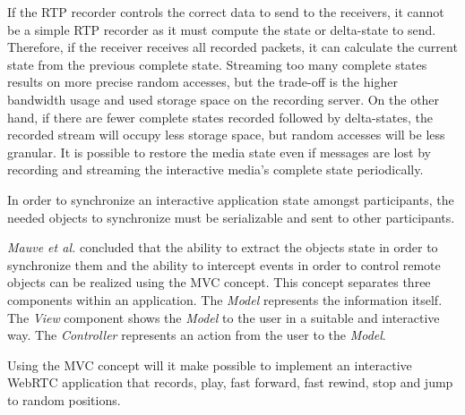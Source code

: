 	If the \ac{RTP} recorder controls the correct data to send to the receivers, it cannot be a simple \ac{RTP} recorder as it must compute the state or delta-state to send. Therefore, if the receiver receives all recorded packets, it can calculate the current state from the previous complete state. Streaming too many complete states results on more precise random accesses, but the trade-off is the higher bandwidth usage and used storage space on the recording server. On the other hand, if there are fewer complete states recorded followed by delta-states, the recorded stream will occupy less storage space, but random accesses will be less granular.
	It is possible to restore the media state even if messages are lost by recording and streaming the interactive media's complete state periodically.

	In order to synchronize an interactive application state amongst participants, the needed objects to synchronize must be serializable and sent to other participants.

	\emph{Mauve et al.} concluded that the ability to extract the objects state in order to synchronize them and the ability to intercept events in order to control remote objects can be realized using the \ac{MVC} concept\cite{interactive_stream}.
        This concept separates three components within an application. The \emph{Model} represents the information itself. The \emph{View} component shows the \emph{Model} to the user in a suitable and interactive way. The \emph{Controller} represents an action from the user to the \emph {Model}. 

	Using the \ac{MVC} concept will it make possible to implement an interactive \ac{WebRTC} application that records, play, fast forward, fast rewind, stop and jump to random positions.
        
    

